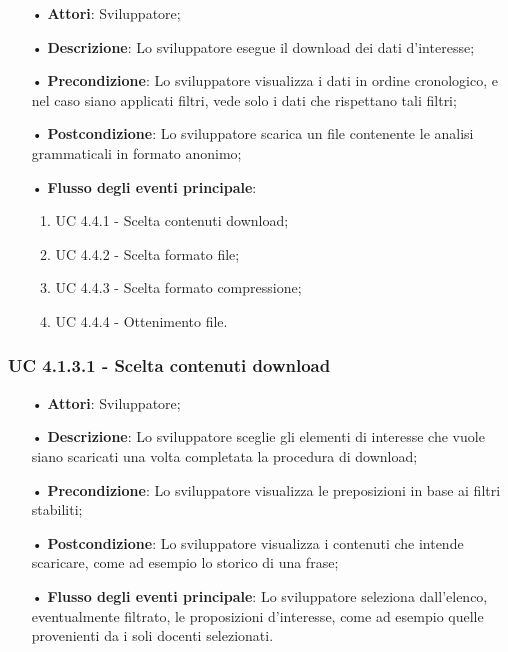 \begin{itemize}
\item[•]\textbf{Attori}: Sviluppatore;
\item[•]\textbf{Descrizione}: Lo sviluppatore esegue il download dei dati d'interesse;
\item[•]\textbf{Precondizione}: Lo sviluppatore visualizza i dati in ordine cronologico, e nel caso siano applicati filtri, vede solo i dati che rispettano tali filtri;
\item[•]\textbf{Postcondizione}:  Lo sviluppatore scarica un file contenente le analisi grammaticali in formato anonimo;
\item[•]\textbf{Flusso degli eventi principale}:
\begin{enumerate}
\item UC 4.4.1 - Scelta contenuti download;
\item UC 4.4.2 - Scelta formato file;
\item UC 4.4.3 - Scelta formato compressione;
\item UC 4.4.4 - Ottenimento file.
\end{enumerate}
\end{itemize}

\subsubsection{UC 4.1.3.1 - Scelta contenuti download}
\begin{itemize}
\item[•]\textbf{Attori}: Sviluppatore;
\item[•]\textbf{Descrizione}: Lo sviluppatore sceglie gli elementi di interesse che vuole siano scaricati una volta completata la procedura di download;
\item[•]\textbf{Precondizione}: Lo sviluppatore visualizza le preposizioni in base ai filtri stabiliti;
\item[•]\textbf{Postcondizione}:  Lo sviluppatore visualizza i contenuti che intende scaricare, come ad esempio lo storico di una frase;
\item[•]\textbf{Flusso degli eventi principale}:  Lo sviluppatore seleziona dall'elenco, eventualmente filtrato, le proposizioni d'interesse, come ad esempio quelle provenienti da i soli docenti selezionati.
\end{itemize}

